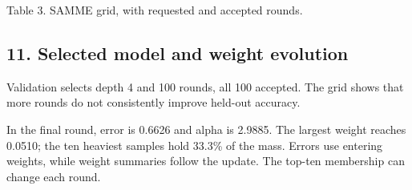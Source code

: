 \documentclass[10pt,twocolumn,letterpaper]{article}
\begin{document}
{\centering
{}
\ifdim\wd\reporttablebox>\columnwidth
\resizebox{\columnwidth}{!}{\usebox{\reporttablebox}}
\else\usebox{\reporttablebox}\fi
\par\small Table 3. SAMME grid, with requested and accepted rounds.
\par}
\vspace{4pt}
\subsection*{11. Selected model and weight evolution}
Validation selects depth 4 and 100 rounds, all 100 accepted. The grid shows that more rounds do not consistently improve held-out accuracy.

In the final round, error is 0.6626 and alpha is 2.9885. The largest weight reaches 0.0510; the ten heaviest samples hold 33.3\% of the mass. Errors use entering weights, while weight summaries follow the update. The top-ten membership can change each round.
\end{document}
